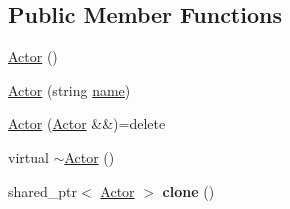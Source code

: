 \subsection*{Public Member Functions}
\begin{DoxyCompactItemize}
\item 
\hyperlink{class_actor_a2a0ff4335a1ee9096df90f288c026c8b}{Actor} ()
\item 
\hyperlink{class_actor_ae4d47c1596ba6c1a872780864b7a57d6}{Actor} (string \hyperlink{class_actor_adc0a0fe742f4bd972168f8ef7ad55e8f}{name})
\item 
\hyperlink{class_actor_ad2f5e5c51e030e2297b1f934420e1cf8}{Actor} (\hyperlink{class_actor}{Actor} \&\&)=delete
\item 
virtual \hyperlink{class_actor_ad807fe8f85e72ab263a0c05e3231cb39}{$\sim$\+Actor} ()
\item 
\hypertarget{class_actor_a015e66865b31e58e6b6250a3fda088d6}{}shared\+\_\+ptr$<$ \hyperlink{class_actor}{Actor} $>$ {\bfseries clone} ()\label{class_actor_a015e66865b31e58e6b6250a3fda088d6}


\end{DoxyCompactItemize}
